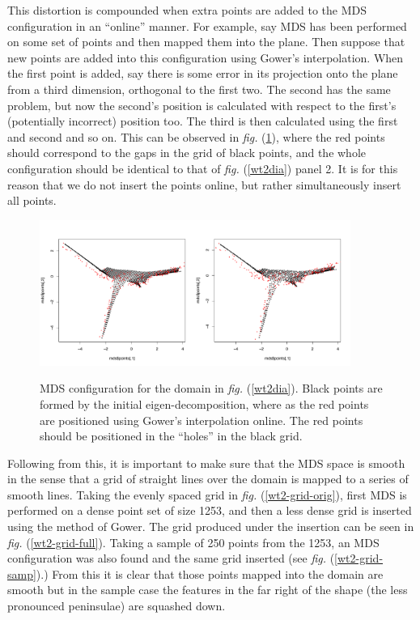 \documentclass[a4paper,10pt]{article}
\newcommand{\fig}[1]{\emph{fig.} (\ref{#1})}
\begin{document}
This distortion is compounded when extra points are added to the MDS configuration in an ``online'' manner. For example, say MDS has been performed on some set of points and then mapped them into the plane. Then suppose that new points are added into this configuration using Gower's interpolation. When the first point is added, say there is some error in its projection onto the plane from a third dimension, orthogonal to the first two. The second has the same problem, but now the second's position is calculated with respect to the first's (potentially incorrect) position too. The third is then calculated using the first and second and so on. This can be observed in \fig{gowererror}, where the red points should correspond to the gaps in the grid of black points, and the whole configuration should be identical to that of \fig{wt2dia} panel 2. It is for this reason that we do not insert the points online, but rather simultaneously insert all points.

\begin{figure}
\centering
\includegraphics[width=4in]{figs/gowererror.pdf} \\
\caption{MDS configuration for the domain in \fig{wt2dia}. Black points are formed by the initial eigen-decomposition, where as the red points are positioned using Gower's interpolation online. The red points should be positioned in the ``holes'' in the black grid.}
\label{gowererror}
\end{figure}


Following from this, it is important to make sure that the MDS space is smooth in the sense that a grid of straight lines over the domain is mapped to a series of smooth lines. Taking the evenly spaced grid in \fig{wt2-grid-orig}, first MDS is performed on a dense point set of size 1253, and then a less dense grid is inserted using the method of Gower. The grid produced under the insertion can be seen in \fig{wt2-grid-full}. Taking a sample of 250 points from the 1253, an MDS configuration was also found and the same grid inserted (see \fig{wt2-grid-samp}.) From this it is clear that those points mapped into the domain are smooth but in the sample case the features in the far right of the shape (the less pronounced peninsulae) are squashed down.
\end{document}
